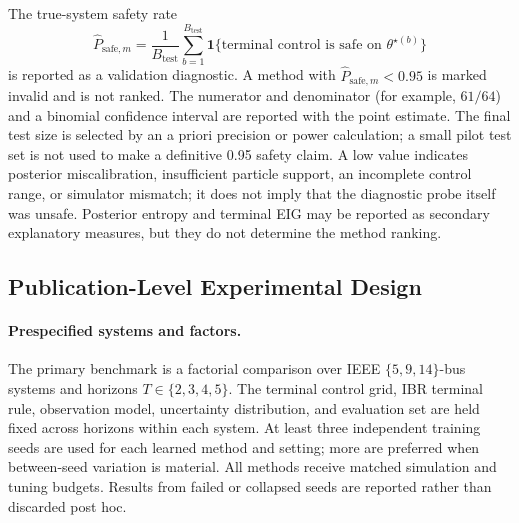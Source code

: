 \documentclass[11pt]{article}
\begin{document}
The true-system safety rate
\[
\widehat P_{\mathrm{safe},m}
=
\frac{1}{B_{\mathrm{test}}}
\sum_{b=1}^{B_{\mathrm{test}}}
\mathbf 1\{\text{terminal control is safe on }\theta^{\star(b)}\}
\]
is reported as a validation diagnostic. A method with \(\widehat P_{\mathrm{safe},m}<0.95\) is marked invalid and is not ranked. The numerator and denominator (for example, \(61/64\)) and a binomial confidence interval are reported with the point estimate. The final test size is selected by an a priori precision or power calculation; a small pilot test set is not used to make a definitive 0.95 safety claim. A low value indicates posterior miscalibration, insufficient particle support, an incomplete control range, or simulator mismatch; it does not imply that the diagnostic probe itself was unsafe. Posterior entropy and terminal EIG may be reported as secondary explanatory measures, but they do not determine the method ranking.

\subsection{Publication-Level Experimental Design}

\paragraph{Prespecified systems and factors.}
The primary benchmark is a factorial comparison over IEEE
\(\{5,9,14\}\)-bus systems and horizons \(T\in\{2,3,4,5\}\). The terminal
control grid, IBR terminal rule, observation model,
uncertainty distribution, and evaluation set are held fixed across horizons
within each system. At least three independent training seeds are used for
each learned method and setting; more are preferred when between-seed
variation is material. All methods receive matched simulation and tuning
budgets. Results from failed or collapsed seeds are reported rather than
discarded post hoc.
\end{document}
